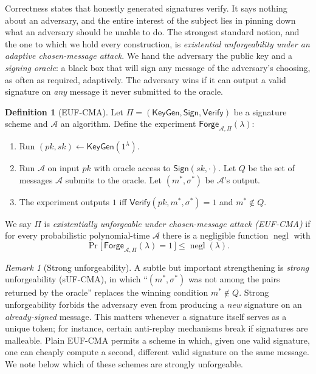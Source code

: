 \documentclass[11pt,a4paper]{article}
\theoremstyle{definition}
\newtheorem{definition}[theorem]{Definition}
\theoremstyle{remark}
\newtheorem{remark}[theorem]{Remark}
\DeclareMathOperator{\negl}{negl}
\begin{document}
Correctness states that honestly generated signatures verify. It says nothing about an adversary, and the entire interest of the subject lies in pinning down what an adversary should be unable to do. The strongest standard notion, and the one to which we hold every construction, is \emph{existential unforgeability under an adaptive chosen-message attack}. We hand the adversary the public key and a \emph{signing oracle}: a black box that will sign any message of the adversary's choosing, as often as required, adaptively. The adversary wins if it can output a valid signature on \emph{any} message it never submitted to the oracle.

\begin{definition}[EUF-CMA]\label{signatures:def:eufcma}
Let \(\Pi = (\mathsf{KeyGen}, \mathsf{Sign}, \mathsf{Verify})\) be a signature scheme and \(\mathcal{A}\) an algorithm. Define the experiment \(\mathsf{Forge}_{\mathcal{A},\Pi}(\lambda)\):
\begin{enumerate}
  \item Run \((\mathit{pk}, \mathit{sk}) \gets \mathsf{KeyGen}(1^\lambda)\).
  \item Run \(\mathcal{A}\) on input \(\mathit{pk}\) with oracle access to \(\mathsf{Sign}(\mathit{sk}, \cdot)\). Let \(Q\) be the set of messages \(\mathcal{A}\) submits to the oracle. Let \((m^\ast, \sigma^\ast)\) be \(\mathcal{A}\)'s output.
  \item The experiment outputs \(1\) iff \(\mathsf{Verify}(\mathit{pk}, m^\ast, \sigma^\ast) = 1\) and \(m^\ast \notin Q\).
\end{enumerate}
We say \(\Pi\) is \emph{existentially unforgeable under chosen-message attack (EUF-CMA)} if for every probabilistic polynomial-time \(\mathcal{A}\) there is a negligible function \(\negl\) with
\[
  \Pr\!\big[\, \mathsf{Forge}_{\mathcal{A},\Pi}(\lambda) = 1 \,\big] \le \negl(\lambda).
\]
\end{definition}

\begin{remark}[Strong unforgeability]\label{signatures:rem:suf}
A subtle but important strengthening is \emph{strong} unforgeability (sUF-CMA), in which ``\((m^\ast, \sigma^\ast)\) was not among the pairs returned by the oracle'' replaces the winning condition \(m^\ast \notin Q\). Strong unforgeability forbids the adversary even from producing a \emph{new} signature on an \emph{already-signed} message. This matters whenever a signature itself serves as a unique token; for instance, certain anti-replay mechanisms break if signatures are malleable. Plain EUF-CMA permits a scheme in which, given one valid signature, one can cheaply compute a second, different valid signature on the same message. We note below which of these schemes are strongly unforgeable.
\end{remark}
\end{document}
